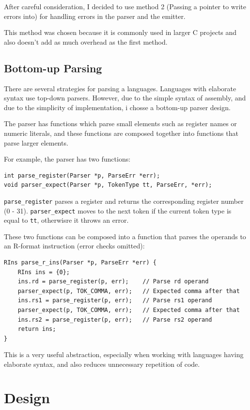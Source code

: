 \documentclass{article}
\begin{document}
After careful consideration, I decided to use method 2 (Passing
a pointer to write errors into) for handling errors in the
parser and the emitter.

This method was chosen because it is commonly used in larger C projects
and also doesn't add as much overhead as the first method.

\subsection{Bottom-up Parsing}

There are several strategies for parsing a languages. Languages with
elaborate syntax use top-down parsers. However, due to the simple
syntax of assembly, and due to the simplicity of implementation, i
chosse a bottom-up parser design.

The parser has functions which parse small elements such as register
names or numeric literals, and these functions are composed together
into functions that parse larger elements.

For example, the parser has two functions:
\begin{verbatim}
int parse_register(Parser *p, ParseErr *err);
void parser_expect(Parser *p, TokenType tt, ParseErr, *err);
\end{verbatim}

\texttt{parse\_register} parses a register and returns the
corresponding register number (0 - 31). \texttt{parser\_expect}
moves to the next token if the current token type is equal to
\texttt{tt}, otherwisre it throws an error.

These two functions can be composed into a function that parses the operands
to an R-format instruction (error checks omitted):

\begin{verbatim}
RIns parse_r_ins(Parser *p, ParseErr *err) {
    RIns ins = {0};
    ins.rd = parse_register(p, err);    // Parse rd operand
    parser_expect(p, TOK_COMMA, err);   // Expected comma after that
    ins.rs1 = parse_register(p, err);   // Parse rs1 operand 
    parser_expect(p, TOK_COMMA, err);   // Expected comma after that
    ins.rs2 = parse_register(p, err);   // Parse rs2 operand
    return ins;
}
\end{verbatim}

This is a very useful abstraction, especially when working with languages
having elaborate syntax, and also reduces unnecessary repetition of code.

\section{Design}
\end{document}
